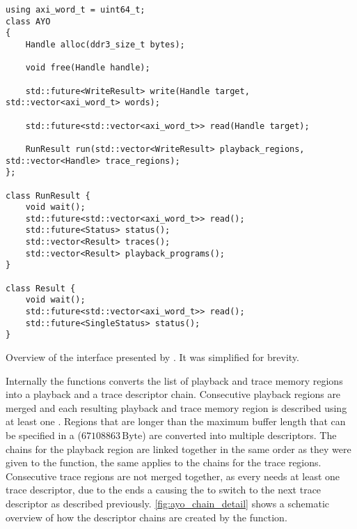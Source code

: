 \begin{listing}
\begin{verbatim}
using axi_word_t = uint64_t;
class AYO
{
	Handle alloc(ddr3_size_t bytes);

	void free(Handle handle);

	std::future<WriteResult> write(Handle target, std::vector<axi_word_t> words);

	std::future<std::vector<axi_word_t>> read(Handle target);

	RunResult run(std::vector<WriteResult> playback_regions, std::vector<Handle> trace_regions);
};

class RunResult {
	void wait();
	std::future<std::vector<axi_word_t>> read();
	std::future<Status> status();
	std::vector<Result> traces();
	std::vector<Result> playback_programs();
}

class Result {
	void wait();
	std::future<std::vector<axi_word_t>> read();
	std::future<SingleStatus> status();
}
\end{verbatim}
\caption{Overview of the interface presented by \ayo{}. It was simplified for brevity.}\label{listing:ayo_interface}
\end{listing}

Internally the  functions converts the list of playback and trace memory regions into a playback and a trace descriptor chain. Consecutive playback regions are merged and each resulting playback and trace memory region is described using at least one \descriptor{}. Regions that are longer than the maximum buffer length that can be specified in a \descriptor{} ($\num{67108863}\,\text{Byte}$) are converted into multiple descriptors. The \descriptor{} chains for the playback region are linked together in the same order as they were given to the  function, the same applies to the \descriptor{} chains for the trace regions. Consecutive trace regions are not merged together, as every \PlaybackProgram{} needs at least one trace descriptor, due to the \haltInstr{} ends a \PlaybackProgram{} causing the \AXIDMA{} to switch to the next trace descriptor as described previously.
\autoref{fig:ayo_chain_detail} shows a schematic overview of how the descriptor chains are created by the  function.

